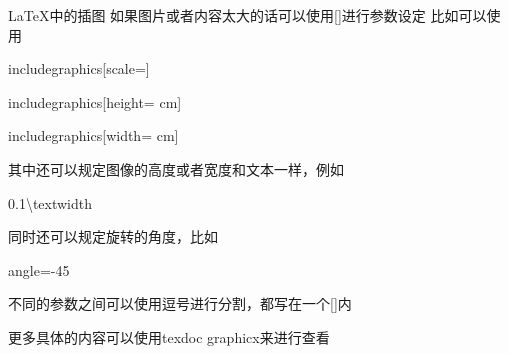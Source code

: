 \documentclass{ctexart}
\begin{document}
    \LaTeX{}中的插图
    如果图片或者内容太大的话可以使用[]进行参数设定
    比如可以使用

    includegraphics[scale=]

    includegraphics[height= cm]
    
    includegraphics[width= cm]
    
    其中还可以规定图像的高度或者宽度和文本一样，例如

    0.1\textbackslash textwidth

    同时还可以规定旋转的角度，比如

    angle=-45

    不同的参数之间可以使用逗号进行分割，都写在一个[]内

    更多具体的内容可以使用texdoc graphicx来进行查看
\end{document}
